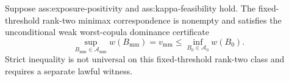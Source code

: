 Suppose ass:exposure-positivity and ass:kappa-feasibility hold.  The fixed-threshold rank-two minimax correspondence is nonempty and satisfies the unconditional weak worst-copula dominance certificate
\[
\sup_{B_{\mathrm{mm}}\in\mathcal A_{\mathrm{mm}}}w(B_{\mathrm{mm}})
=v_{\mathrm{mm}}
\le
\inf_{B_0\in\mathcal A_0}w(B_0).
\]
Strict inequality is not universal on this fixed-threshold rank-two class and requires a separate lawful witness.